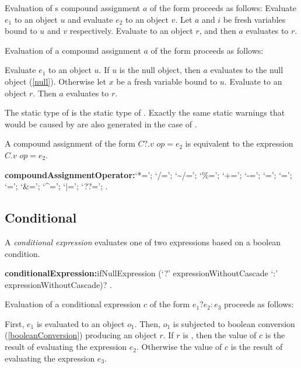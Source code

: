 \documentclass{article}
\begin{document}
\LMHash{}
Evaluation of s compound assignment $a$ of the form  proceeds as follows:
Evaluate $e_1$ to an object $u$ and evaluate $e_2$ to an object $v$.
Let $a$ and $i$ be fresh variables bound to $u$ and $v$ respectively.
Evaluate  to an object $r$,
and then $a$ evaluates to $r$.

\LMHash{}
Evaluation of a compound assignment $a$ of the form  proceeds as follows:

\LMHash{}
Evaluate $e_1$ to an object $u$.
If $u$ is the null object, then $a$ evaluates to the null object (\ref{null}).
Otherwise let $x$ be a fresh variable bound to $u$.
Evaluate  to an object $r$.
Then $a$ evaluates to $r$.

\LMHash{}
The static type of  is the static type of .
Exactly the same static warnings that would be caused by  are also generated in the case of .

\LMHash{}
A compound assignment of the form $C?.v$ $op = e_2$ is equivalent to the expression
$C.v$ $op = e_2$.

\begin{grammar}
{\bf compoundAssignmentOperator:}`*=';
  `/=';
  `\~{}/=';
  `\%=';
  `+=';
  `-=';
  `{\escapegrammar \lt \lt}=';
  `{\escapegrammar \gt \gt}=';
  `{\escapegrammar \gt \gt \gt}=';
  `\&=';
  `\^{}=';
  `$|$=';
  `??=';
  .
\end{grammar}


\subsection{Conditional}

\LMHash{}
A {\em conditional expression} evaluates one of two expressions based on a boolean condition.

\begin{grammar}
{\bf conditionalExpression:}ifNullExpression
  \gnewline{} (`?' expressionWithoutCascade `{\escapegrammar :}' expressionWithoutCascade)?
  .
\end{grammar}

\LMHash{}
Evaluation of a conditional expression $c$ of the form $e_1 ? e_2 : e_3$ proceeds as follows:

\LMHash{}
First, $e_1$ is evaluated to an object $o_1$.
Then, $o_1$ is subjected to boolean conversion (\ref{booleanConversion}) producing an object $r$.
If $r$ is \TRUE, then the value of $c$ is the result of evaluating the expression $e_2$.
Otherwise the value of $c$ is the result of evaluating the expression $e_3$.
\end{document}
